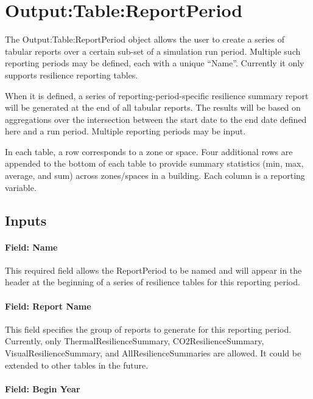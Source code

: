 \section{Output:Table:ReportPeriod}\label{outputtablereportperiod}

The Output:Table:ReportPeriod object allows the user to create a series of
tabular reports over a certain sub-set of a simulation run period. Multiple such
reporting periods may be defined, each with a unique ``Name''. Currently it only
supports resilience reporting tables.

When it is defined, a series of reporting-period-specific resilience summary
report will be generated at the end of all tabular reports. The results will be
based on aggregations over the intersection between the start date to the end
date defined here and a run period. Multiple reporting periods may be input.

In each table, a row corresponds to a zone or space. Four additional rows are
appended to the bottom of each table to provide summary statistics (min, max,
average, and sum) across zones/spaces in a building. Each column is a reporting
variable.

\subsection{Inputs}\label{inputs-074}

\paragraph{Field: Name}\label{field-name-066}

This required field allows the ReportPeriod to be named and will appear in the
header at the beginning of a series of resilience tables for this reporting
period.

\paragraph{Field: Report Name}\label{report-name-1}

This field specifies the group of reports to generate for this reporting period.
Currently, only ThermalResilienceSummary, CO2ResilienceSummary,
VisualResilienceSummary, and AllResilienceSummaries are allowed. It could be
extended to other tables in the future.

\paragraph{Field: Begin Year}\label{field-begin-year-2}

